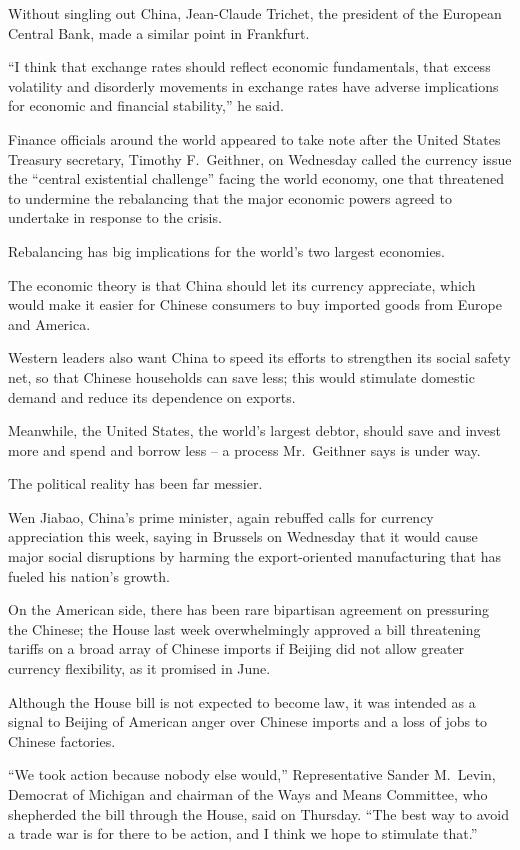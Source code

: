 ﻿\documentclass[12pt]{article}
\begin{document}
Without singling out China, Jean-Claude Trichet, the president of the European Central Bank, made a
similar point in Frankfurt.

``I think that exchange rates should reflect economic fundamentals, that excess volatility and
disorderly movements in exchange rates have adverse implications for economic and financial
stability,'' he said.

Finance officials around the world appeared to take note after the United States Treasury secretary,
Timothy F.~Geithner, on Wednesday called the currency issue the ``central existential challenge''
facing the world economy, one that threatened to undermine the rebalancing that the major economic
powers agreed to undertake in response to the crisis.

Rebalancing has big implications for the world's two largest economies.

The economic theory is that China should let its currency appreciate, which would make it easier for
Chinese consumers to buy imported goods from Europe and America.

Western leaders also want China to speed its efforts to strengthen its social safety net, so that
Chinese households can save less; this would stimulate domestic demand and reduce its dependence on
exports.

Meanwhile, the United States, the world's largest debtor, should save and invest more and spend and
borrow less -- a process Mr.~Geithner says is under way.

The political reality has been far messier.

Wen Jiabao, China's prime minister, again rebuffed calls for currency appreciation this week, saying
in Brussels on Wednesday that it would cause major social disruptions by harming the export-oriented
manufacturing that has fueled his nation's growth.

On the American side, there has been rare bipartisan agreement on pressuring the Chinese; the House
last week overwhelmingly approved a bill threatening tariffs on a broad array of Chinese imports if
Beijing did not allow greater currency flexibility, as it promised in June.

Although the House bill is not expected to become law, it was intended as a signal to Beijing of
American anger over Chinese imports and a loss of jobs to Chinese factories.

``We took action because nobody else would,'' Representative Sander M.~Levin, Democrat of Michigan
and chairman of the Ways and Means Committee, who shepherded the bill through the House, said on
Thursday. ``The best way to avoid a trade war is for there to be action, and I think we hope to
stimulate that.''
\end{document}
